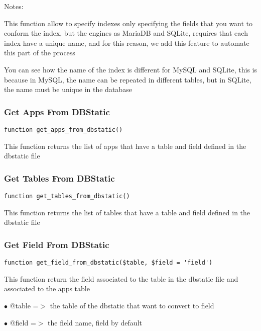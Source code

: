 \documentclass[a4paper]{article}
\begin{document}
Notes:

This function allow to specify indexes only specifying the fields that you want
to conform the index, but the engines as MariaDB and SQLite, requires that each
index have a unique name, and for this reason, we add this feature to automate
this part of the process

You can see how the name of the index is different for MySQL and SQLite, this is
because in MySQL, the name can be repeated in different tables, but in SQLite,
the name must be unique in the database

\hypertarget{toc424}{}
\subsubsection{Get Apps From DBStatic}

\begin{lstlisting}
function get_apps_from_dbstatic()
\end{lstlisting}

This function returns the list of apps that have a table and field defined
in the dbstatic file

\hypertarget{toc425}{}
\subsubsection{Get Tables From DBStatic}

\begin{lstlisting}
function get_tables_from_dbstatic()
\end{lstlisting}

This function returns the list of tables that have a table and field defined
in the dbstatic file

\hypertarget{toc426}{}
\subsubsection{Get Field From DBStatic}

\begin{lstlisting}
function get_field_from_dbstatic($table, $field = 'field')
\end{lstlisting}

This function return the field associated to the table in the dbstatic
file and associated to the apps table

\begin{compactitem}
\item[\color{myblue}$\bullet$] @table =$>$ the table of the dbstatic that want to convert to field
\item[\color{myblue}$\bullet$] @field =$>$ the field name, field by default
\end{compactitem}
\end{document}

